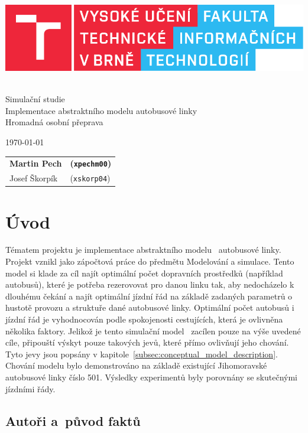 \documentclass[a4paper]{article}
\newcommand{\logo} {
    \includegraphics[scale=0.8, keepaspectratio]{fig/logo.pdf}
}
\begin{document}
    \begin{titlepage}
        \begin{center}
            \logo
            \\
            {\Huge Simulační studie}\\\medskip
            {\LARGE Implementace abstraktního modelu autobusové linky}\\\medskip
            {\large	Hromadná osobní přeprava}
        \end{center}
        {\Large \today \hfill
        \begin{tabular}{l l}
            \textbf{Martin Pech} & \textbf{(\texttt{xpechm00})} \\
            Josef Škorpík & (\texttt{xskorp04})
        \end{tabular}}
    \end{titlepage}

    \newpage

	\section{Úvod}
    \label{sec:intro}

    Tématem projektu je implementace abstraktního modelu~\cite[snímek 10]{IMS_slides} autobusové linky. Projekt vznikl jako zápočtová práce do předmětu Modelování a simulace.
    Tento model si klade za cíl najít optimální počet dopravních prostředků (například autobusů), které je potřeba rezerovovat pro danou linku tak, aby nedocházelo k dlouhému čekání a najít optimální jízdní řád na základě zadaných parametrů o hustotě provozu a struktuře dané autobusové linky. Optimální počet autobusů i jízdní řád je vyhodnocován podle spokojenosti cestujících, která je ovlivněna několika faktory. Jelikož je tento simulační model~\cite[snímek 44]{IMS_slides} zacílen pouze na výše uvedené cíle, připouští výskyt pouze takových jevů, které přímo ovlivňují jeho chování. Tyto jevy jsou popsány v kapitole~\ref{subsec:conceptual_model_description}.
    Chování modelu bylo demonstrováno na základě existující Jihomoravské autobusové linky číslo 501. Výsledky experimentů byly porovnány se skutečnými jízdními řády.

        \subsection{Autoři a~původ faktů}
        \label{subsec:authors}
\end{document}
